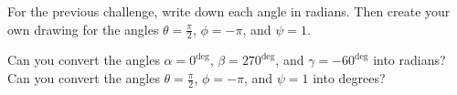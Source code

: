 \documentclass[12pt, a4paper]{article}
\begin{document}
\vs\vs
\begin{ex}
  For the previous challenge, write down each angle in radians.  Then create your own drawing for the angles $\theta = \frac{\pi}{2}$, $\phi = -\pi$, and $\psi = 1$.
\end{ex}
\begin{thrm}
\end{thrm}
\vs\vs\vs
\begin{ex}
  Can you convert the angles $\alpha = 0^\deg$, $\beta = 270^\deg$, and $\gamma = -60^\deg$ into radians?  Can you convert the angles $\theta = \frac{\pi}{2}$, $\phi = -\pi$, and $\psi = 1$ into degrees?
\end{ex}
\end{document}
